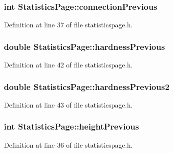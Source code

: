 \subsubsection[{connection\+Previous}]{\setlength{\rightskip}{0pt plus 5cm}int Statistics\+Page\+::connection\+Previous}\label{class_statistics_page_ad87b2ecc9e6d3c1575627fe189ce61f8}


Definition at line 37 of file statisticspage.\+h.

\hypertarget{class_statistics_page_a26dc0dffb8caecf22d3d741704768bd0}{}
\subsubsection[{hardness\+Previous}]{\setlength{\rightskip}{0pt plus 5cm}double Statistics\+Page\+::hardness\+Previous}\label{class_statistics_page_a26dc0dffb8caecf22d3d741704768bd0}


Definition at line 42 of file statisticspage.\+h.

\hypertarget{class_statistics_page_a84beb1c9bfa4fa40fd0a05c68d026ffd}{}
\subsubsection[{hardness\+Previous2}]{\setlength{\rightskip}{0pt plus 5cm}double Statistics\+Page\+::hardness\+Previous2}\label{class_statistics_page_a84beb1c9bfa4fa40fd0a05c68d026ffd}


Definition at line 43 of file statisticspage.\+h.

\hypertarget{class_statistics_page_a84569b20c6a5f1e5970c9ec28fce6a94}{}
\subsubsection[{height\+Previous}]{\setlength{\rightskip}{0pt plus 5cm}int Statistics\+Page\+::height\+Previous}\label{class_statistics_page_a84569b20c6a5f1e5970c9ec28fce6a94}


Definition at line 36 of file statisticspage.\+h.

